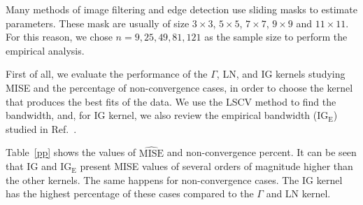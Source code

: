 \documentclass[twocolumn]{svjour3}
\begin{document}
	Many methods of image filtering and edge detection use sliding masks to estimate parameters. 
	These mask are usually of size $3 \times 3$, $5 \times 5$, $7 \times 7$, $9 \times 9$ and $11 \times 11$. 
	For this reason, we chose $n=9,25,49,81,121$ as the sample size to perform the empirical analysis.
	
	First of all, we evaluate the performance of the $\Gamma$, LN, and IG kernels studying MISE and the percentage of non-convergence cases, in order to choose the kernel that produces the best fits of the data. 
	We use the LSCV method to find the bandwidth, and, for IG kernel, we also review the empirical bandwidth ($\text{IG}_{\text{E}}$) studied in Ref.~\cite{gambini2015}. 
	
	Table~\ref{pp} shows the values of $\widehat{\text{MISE}}$ and non-convergence percent. 
	It can be seen that IG and $\text{IG}_{\text{E}}$ present MISE values of several orders of magnitude higher than the other kernels. 
	The same happens for non-convergence cases. 
	The IG kernel has the highest percentage of these cases compared to the $\Gamma$ and LN kernel.
	
\end{document}
